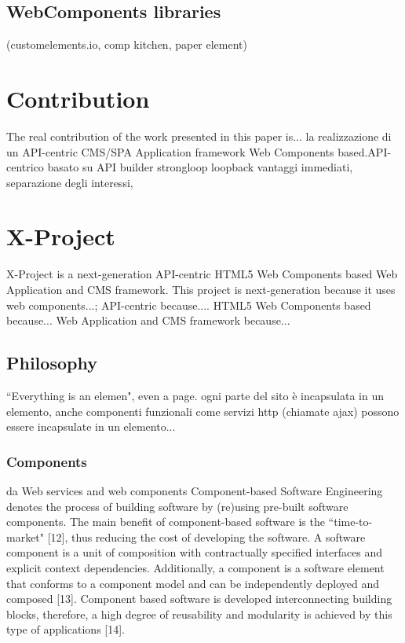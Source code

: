 \documentclass{sig-alternate}
\begin{document}
\subsection{WebComponents libraries}

(customelements.io, comp kitchen, paper element)

\section{Contribution}

The real contribution of the work presented in this paper is...
la realizzazione di un API-centric CMS/SPA Application framework Web Components based.API-centrico basato su API builder strongloop loopback vantaggi immediati, separazione degli interessi, 

\section{X-Project}

X-Project is a next-generation API-centric HTML5 Web Components based Web Application and CMS framework.
This project is next-generation because it uses web components...;
API-centric because....
HTML5 Web Components based because...
Web Application and CMS framework because...



\subsection{Philosophy}

``Everything is an elemen", even a page. 
ogni parte del sito \`e incapsulata in un elemento, anche componenti funzionali come servizi http (chiamate ajax) possono essere incapsulate in un elemento...

\subsubsection{Components}

da Web services and web components
Component-based Software Engineering denotes the process of building software by (re)using pre-built software components. The main benefit of component-based software is the ``time-to-market" [12], thus reducing the cost of developing the software. A software component is a unit of composition with contractually specified interfaces and explicit context dependencies. Additionally, a component is a software element that conforms to a component model and can be independently deployed and composed [13]. Component based software is developed interconnecting building blocks, therefore, a high degree of reusability and modularity is achieved by this type of applications [14].
\end{document}

